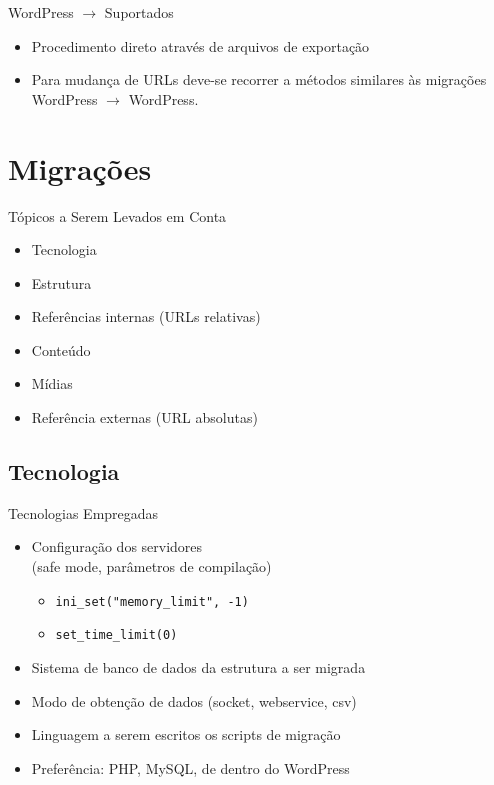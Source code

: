 \documentclass{beamer}
\begin{document}
\begin{frame}{WordPress $\rightarrow$ Suportados}
\begin{itemize}
  \item Procedimento direto através de arquivos de exportação
  \item Para mudança de URLs deve-se recorrer a métodos
        similares às migrações WordPress $\rightarrow$ WordPress.
\end{itemize}
\end{frame}


\section{Migrações}

\begin{frame}{Tópicos a Serem Levados em Conta}
  \pause
  \begin{itemize}
    \pause \item Tecnologia
    \pause \item Estrutura
    \pause \item Referências internas (URLs relativas)
    \pause \item Conteúdo
    \pause \item Mídias
    \pause \item Referência externas (URL absolutas)
  \end{itemize}
\end{frame}

\subsection{Tecnologia}

\begin{frame}{Tecnologias Empregadas}
  \begin{itemize}
    \pause \item Configuração dos servidores\pause \\
                 (safe mode, parâmetros de compilação)
    \begin{itemize}
      \pause \item \texttt{ini\_set("memory\_limit", -1)}
      \pause \item \texttt{set\_time\_limit(0)}
    \end{itemize}
    \pause \item Sistema de banco de dados da estrutura a ser migrada
    \pause \item Modo de obtenção de dados (socket, webservice, csv)
    \pause \item Linguagem a serem escritos os scripts de migração
    \pause \item Preferência: \pause PHP\pause, MySQL\pause, de dentro
                 do WordPress
  \end{itemize}
\end{frame}
\end{document}
